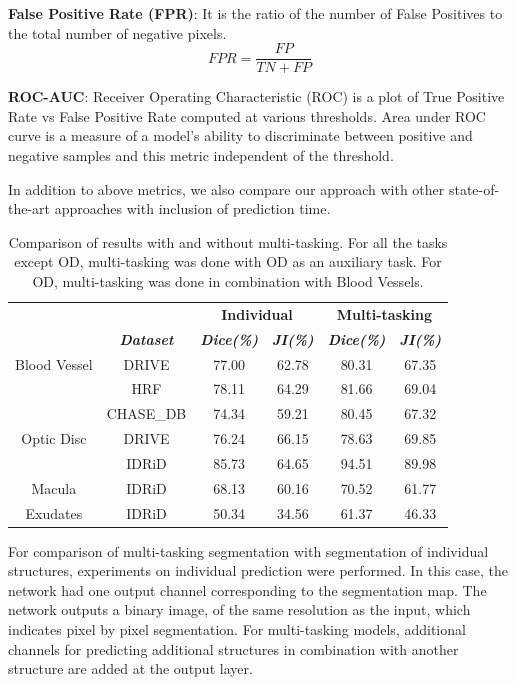 \documentclass[utf8]{FrontiersinHarvard} %
\begin{document}
\textbf{False Positive Rate (FPR)}: It is the ratio of the number of False Positives to the total number of negative pixels.
\begin{equation}
FPR = \frac{FP}{TN + FP}
\end{equation}

\textbf{ROC-AUC}: Receiver Operating Characteristic (ROC) is a plot of True Positive Rate vs False Positive Rate computed at various thresholds. Area under ROC curve is a measure of a model's ability to discriminate between positive and negative samples and this metric independent of the threshold.


In addition to above metrics, we also compare our approach with other state-of-the-art approaches  with inclusion of prediction time.

\begin{table}[!h]
\caption{Comparison of results with and without multi-tasking. For all the tasks except OD, multi-tasking was done with OD as an auxiliary task. For OD, multi-tasking was done in combination with Blood Vessels.}
\begin{center}
\begin{tabular}{|c|c|c|c|c|c|}
\hline
&&\multicolumn{2}{|c|}{\textbf{Individual}}& \multicolumn{2}{|c|}{\textbf{Multi-tasking}} \\
\cline{3-6}
&\textbf{\textit{Dataset}}& \textbf{\textit{Dice(\%)}}& \textbf{\textit{JI(\%)}}& \textbf{\textit{Dice(\%)}}& \textbf{\textit{JI(\%)}}  \\
\hline
Blood Vessel & DRIVE & 77.00 & 62.78 & 80.31 & 67.35  \\
\cline{2-6}
& HRF & 78.11 & 64.29 & 81.66 & 69.04 \\
\cline{2-6}
& CHASE\_DB & 74.34 & 59.21 & 80.45 & 67.32 \\
\hline
Optic Disc & DRIVE & 76.24 & 66.15 & 78.63 & 69.85  \\
\cline{2-6}
&IDRiD & 85.73 & 64.65 & 94.51 & 89.98 \\
\hline
Macula & IDRiD & 68.13 & 60.16 & 70.52 &  61.77 \\
\hline
Exudates & IDRiD & 50.34 & 34.56 & 61.37 & 46.33  \\
\hline
\end{tabular}
\label{tab:results}
\end{center}
\end{table}

For comparison of multi-tasking segmentation with segmentation of individual structures, experiments on individual prediction were performed. In this case, the network had one output channel corresponding to the segmentation map. The network outputs a binary image, of the same resolution as the input,  which indicates pixel by pixel segmentation. For multi-tasking models, additional channels for predicting additional structures  in combination with another structure are added at the output layer.
\end{document}
